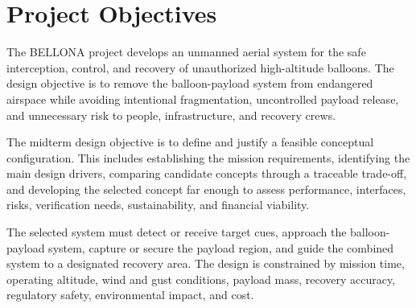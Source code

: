 \chapter{Project Objectives}

The BELLONA project develops an unmanned aerial system for the safe interception, control, and recovery of unauthorized high-altitude balloons. The design objective is to remove the balloon-payload system from endangered airspace while avoiding intentional fragmentation, uncontrolled payload release, and unnecessary risk to people, infrastructure, and recovery crews.

The midterm design objective is to define and justify a feasible conceptual configuration. This includes establishing the mission requirements, identifying the main design drivers, comparing candidate concepts through a traceable trade-off, and developing the selected concept far enough to assess performance, interfaces, risks, verification needs, sustainability, and financial viability.

The selected system must detect or receive target cues, approach the balloon-payload system, capture or secure the payload region, and guide the combined system to a designated recovery area. The design is constrained by mission time, operating altitude, wind and gust conditions, payload mass, recovery accuracy, regulatory safety, environmental impact, and cost.



